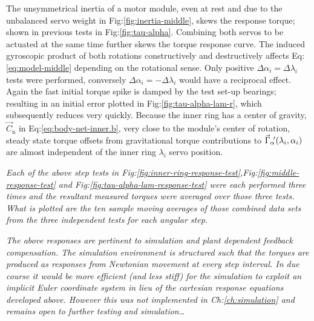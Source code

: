 \par
The unsymmetrical inertia of a motor module, even at rest and due to the unbalanced servo weight in Fig:\ref{fig:inertia-middle}, skews the response torque; shown in previous tests in Fig:\ref{fig:tau-alpha}. Combining both servos to be actuated at the same time further skews the torque response curve. The induced gyroscopic product of both rotations constructively and destructively affects Eq:\ref{eq:model-middle} depending on the rotational sense. Only positive $\Delta\alpha_i=\Delta\lambda_i$ tests were performed, conversely $\Delta\alpha_i=-\Delta\lambda_i$ would have a reciprocal effect. Again the fast initial torque spike is damped by the test set-up bearings; resulting in an initial error plotted in Fig:\ref{fig:tau-alpha-lam-r}, which subsequently reduces very quickly. Because the inner ring has a center of gravity, $\vec{C}_\text{n}$ in Eq:\ref{eq:body-net-inner.b}, very close to the module's center of rotation, steady state torque offsets from gravitational torque contributions to $\vec{\Gamma}_\alpha\hspace{-2pt}'(\lambda_i,\alpha_i)$ are almost independent of the inner ring $\lambda_i$ servo position. 
\par
\emph{\color{Gray} Each of the above step tests in Fig:\ref{fig:inner-ring-response-test},Fig:\ref{fig:middle-response-test} and Fig:\ref{fig:tau-alpha-lam-response-test} were each performed three times and the resultant measured torques were averaged over those three tests. What is plotted are the ten sample moving averages of those combined data sets from the three independent tests for each angular step.}
\par
\emph{\color{Gray}The above responses are pertinent to simulation and plant dependent feedback compensation. The simulation environment is structured such that the torques are produced as responses from Newtonian movement at every step interval. In due course it would be more efficient (and less stiff) for the simulation to exploit an implicit Euler\cite{physicallybased,multibodydynamics} coordinate system in lieu of the cartesian response equations developed above. However this was not implemented in Ch:\ref{ch:simulation} and remains open to further testing and simulation\ldots}
